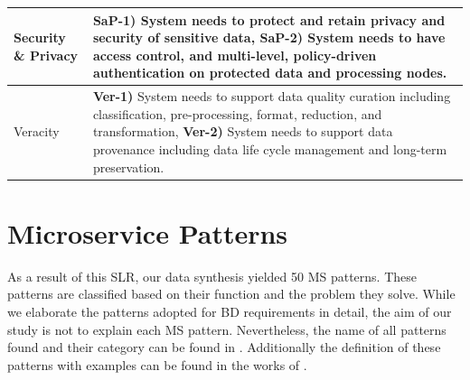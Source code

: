 \documentclass[a4paper,11pt,article,oneside]{memoir}
\begin{document}
\begin{table}[h]
\begin{tabular}{|m{1.2cm}|m{14cm}|}
        \hline

        Security \& Privacy & 
        
        \textbf{SaP-1)} System needs to protect and retain privacy and security of sensitive data, \textbf{SaP-2)} System needs to have access control, and multi-level, policy-driven authentication on protected data and processing nodes. 
        \\

        \hline
        
        Veracity &
        
        \textbf{Ver-1)} System needs to support data quality curation including classification, pre-processing, format, reduction, and  transformation, \textbf{Ver-2)} System needs to support data provenance including data life cycle management and long-term preservation.
        \\
        \hline
  
    \end{tabular}
    \label{table-requirements}
    \end{table}


\section{Microservice Patterns}

As a result of this SLR, our data synthesis yielded 50 MS patterns. These patterns are classified based on their function and the problem they solve. While we elaborate the patterns adopted for BD requirements in detail, the aim of our study is not to explain each MS pattern. Nevertheless, the name of all patterns found and their category can be found in \citet{MSPatterns}. Additionally the definition of these patterns with examples can be found in the works of \citet{Richardson.2022}.

  


 


 
\end{document}
